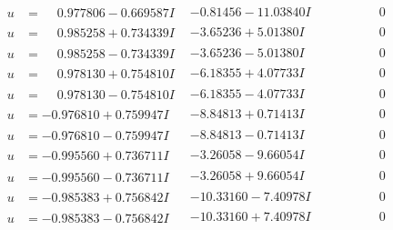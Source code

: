 \documentclass[1p]{elsarticle_modified}
\theoremstyle{definition}
\begin{document}
$$\begin{array}{c|c|c}
\begin{aligned}
u &= \phantom{-}0.977806 - 0.669587 I\end{aligned}
 & -0.81456 - 11.03840 I & \phantom{-0.000000 } 0 \\ \hline\begin{aligned}
u &= \phantom{-}0.985258 + 0.734339 I\end{aligned}
 & -3.65236 + 5.01380 I & \phantom{-0.000000 } 0 \\ \hline\begin{aligned}
u &= \phantom{-}0.985258 - 0.734339 I\end{aligned}
 & -3.65236 - 5.01380 I & \phantom{-0.000000 } 0 \\ \hline\begin{aligned}
u &= \phantom{-}0.978130 + 0.754810 I\end{aligned}
 & -6.18355 + 4.07733 I & \phantom{-0.000000 } 0 \\ \hline\begin{aligned}
u &= \phantom{-}0.978130 - 0.754810 I\end{aligned}
 & -6.18355 - 4.07733 I & \phantom{-0.000000 } 0 \\ \hline\begin{aligned}
u &= -0.976810 + 0.759947 I\end{aligned}
 & -8.84813 + 0.71413 I & \phantom{-0.000000 } 0 \\ \hline\begin{aligned}
u &= -0.976810 - 0.759947 I\end{aligned}
 & -8.84813 - 0.71413 I & \phantom{-0.000000 } 0 \\ \hline\begin{aligned}
u &= -0.995560 + 0.736711 I\end{aligned}
 & -3.26058 - 9.66054 I & \phantom{-0.000000 } 0 \\ \hline\begin{aligned}
u &= -0.995560 - 0.736711 I\end{aligned}
 & -3.26058 + 9.66054 I & \phantom{-0.000000 } 0 \\ \hline\begin{aligned}
u &= -0.985383 + 0.756842 I\end{aligned}
 & -10.33160 - 7.40978 I & \phantom{-0.000000 } 0 \\ \hline\begin{aligned}
u &= -0.985383 - 0.756842 I\end{aligned}
 & -10.33160 + 7.40978 I & \phantom{-0.000000 } 0 \\ \hline\begin{aligned}

\end{aligned}
\end{array}$$
\end{document}

